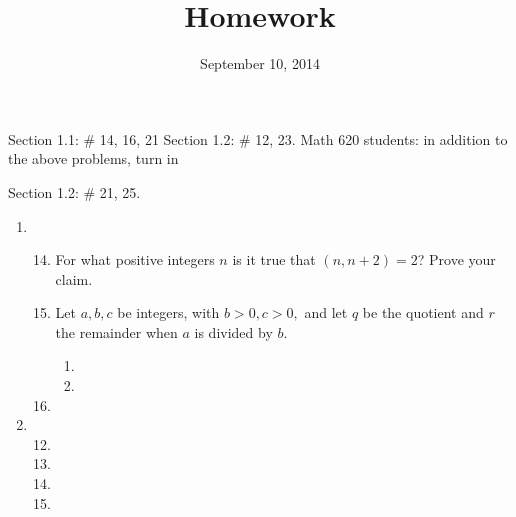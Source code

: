 \documentclass[letterpaper]{article}
\begin{document}
\title{Homework}
\date{September 10, 2014}
\maketitle
Section 1.1: \# 14, 16, 21
Section 1.2: \# 12, 23.
Math 620 students: in addition to the above problems, turn in

Section 1.2: \# 21, 25.
\renewcommand{\labelenumi}{1.\arabic{enumi}}
\renewcommand{\labelenumii}{\arabic{enumii}}
\renewcommand{\labelenumiii}{(\alph{enumiii})}
\begin{enumerate}
\item
\begin{enumerate}
\setcounter{enumii}{13}
\item
For what positive integers $n$ is it true that $(n,n+2)=2$? Prove your claim.
\setcounter{enumii}{15}
\item
Let $a,b,c$ be integers, with $b>0, c>0,$ and let $q$ be the quotient and $r$ the remainder when $a$ is divided by $b$.
\begin{enumerate}
\item
\item
\end{enumerate}
\setcounter{enumii}{20}
\item
\end{enumerate}
\item
\begin{enumerate}
\setcounter{enumii}{11}
\item
\setcounter{enumii}{22}
\item
\setcounter{enumii}{20}
\item
\setcounter{enumii}{24}
\item
\end{enumerate}
\end{enumerate}
\end{document}
